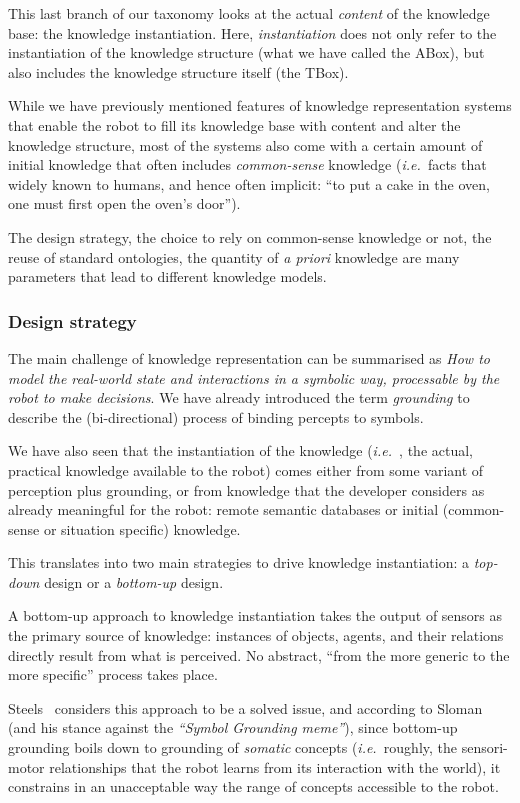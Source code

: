 \documentclass[a4paper, twocolumn]{article}
\newcommand{\ie}{{\textit{i.e.\ }}}
\begin{document}
This last branch of our taxonomy looks at the actual \emph{content} of the
knowledge base: the knowledge instantiation. Here, \emph{instantiation} does
not only refer to the instantiation of the knowledge structure (what we have
called the ABox), but also includes the knowledge structure itself (the TBox).

While we have previously mentioned features of knowledge representation systems
that enable the robot to fill its knowledge base with content and alter the
knowledge structure, most of the systems also come with a certain amount of
initial knowledge that often includes \emph{common-sense} knowledge (\ie facts
that widely known to humans, and hence often implicit: ``to put a cake in the
oven, one must first open the oven's door'').

The design strategy, the choice to rely on common-sense knowledge or not, the
reuse of standard ontologies, the quantity of {\it a priori} knowledge are many
parameters that lead to different knowledge models.

\subsubsection{Design strategy}
\label{sect|design-strategies}

The main challenge of knowledge representation can be summarised as \emph{How
to model the real-world state and interactions in a symbolic way, processable
by the robot to make decisions}. We have already introduced the term
\emph{grounding} to describe the (bi-directional) process of binding percepts
to symbols.

We have also seen that the instantiation of the knowledge (\ie, the actual,
practical knowledge available to the robot) comes either from some variant of
perception plus grounding, or from knowledge that the developer considers as
already meaningful for the robot: remote semantic databases or initial
(common-sense or situation specific) knowledge.

This translates into two main strategies to drive knowledge instantiation: a
\emph{top-down} design or a \emph{bottom-up} design.

A bottom-up approach to knowledge instantiation takes the output of sensors as
the primary source of knowledge: instances of objects, agents, and their
relations directly result from what is perceived. No abstract, ``from the more
generic to the more specific'' process takes place.

Steels~\cite{Steels2007} considers this approach to be a solved issue, and
according to Sloman~\cite{Sloman2007} (and his stance against the
\emph{``Symbol Grounding meme''}), since bottom-up grounding boils down to grounding
of \emph{somatic} concepts (\ie roughly, the sensori-motor relationships that
the robot learns from its interaction with the world), it constrains in an
unacceptable way the range of concepts accessible to the robot.
\end{document}
